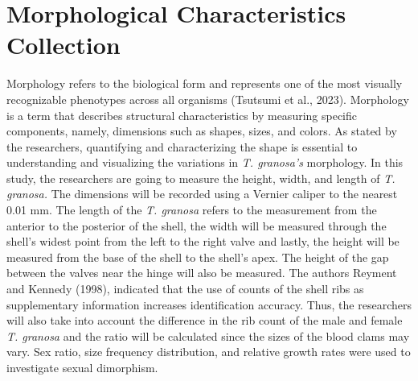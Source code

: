 \section{Morphological Characteristics Collection}
Morphology refers to the biological form and represents one of the most visually recognizable phenotypes across all organisms (Tsutsumi et al., 2023). Morphology is a term that describes structural characteristics by measuring specific components, namely, dimensions such as shapes, sizes, and colors. As stated by the researchers, quantifying and characterizing the shape is essential to understanding and visualizing the variations in \textit{T. granosa’s} morphology. 
In this study, the researchers are going to measure the height, width, and length of \textit{T. granosa.} The dimensions will be recorded using a Vernier caliper to the nearest 0.01 mm. The length of the \textit{T. granosa} refers to the measurement from the anterior to the posterior of the shell, the width will be measured through the shell’s widest point from the left to the right valve and lastly, the height will be measured from the base of the shell to the shell’s apex. The height of the gap between the valves near the hinge will also be measured. The authors Reyment and Kennedy (1998), indicated that the use of counts of the shell ribs as supplementary information increases identification accuracy. Thus, the researchers will also take into account the difference in the rib count of the male and female \textit{T. granosa} and the ratio will be calculated since the sizes of the blood clams may vary.
Sex ratio, size frequency distribution, and relative growth rates were used to investigate sexual dimorphism.

